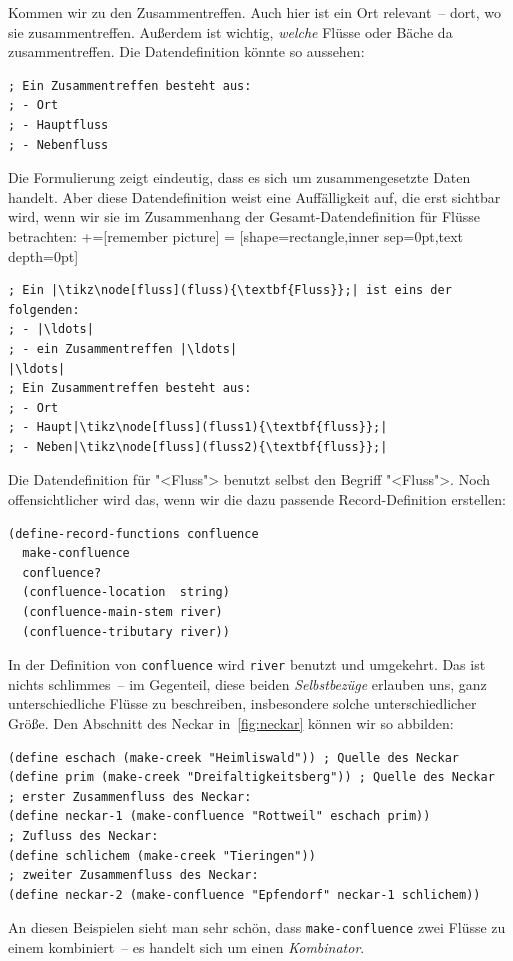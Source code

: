Kommen wir zu den Zusammentreffen.  Auch hier ist ein Ort relevant~--
dort, wo sie zusammentreffen.  Außerdem ist wichtig, \emph{welche}
Flüsse oder Bäche da zusammentreffen.  Die Datendefinition könnte so
aussehen:
%
\begin{lstlisting}
; Ein Zusammentreffen besteht aus:
; - Ort
; - Hauptfluss
; - Nebenfluss
\end{lstlisting}
%
Die Formulierung zeigt eindeutig, dass es sich um zusammengesetzte
Daten handelt.  Aber diese Datendefinition weist eine Auffälligkeit
auf, die erst sichtbar wird, wenn wir sie im Zusammenhang der
Gesamt-Datendefinition für Flüsse betrachten:
%
+=[remember picture]
 = [shape=rectangle,inner sep=0pt,text depth=0pt]
%
\begin{lstlisting}
; Ein |\tikz\node[fluss](fluss){\textbf{Fluss}};| ist eins der folgenden:
; - |\ldots|
; - ein Zusammentreffen |\ldots|
|\ldots|
; Ein Zusammentreffen besteht aus:
; - Ort
; - Haupt|\tikz\node[fluss](fluss1){\textbf{fluss}};|
; - Neben|\tikz\node[fluss](fluss2){\textbf{fluss}};|
\end{lstlisting}
%
%
Die Datendefinition für "<Fluss"> benutzt selbst den Begriff
"<Fluss">.   Noch offensichtlicher wird das, wenn wir die dazu
passende Record-Definition erstellen:
%
\begin{lstlisting}
(define-record-functions confluence
  make-confluence
  confluence?
  (confluence-location  string)
  (confluence-main-stem river)
  (confluence-tributary river))
\end{lstlisting}
%
In der Definition von \texttt{confluence} wird \texttt{river} benutzt
und umgekehrt.  Das ist nichts schlimmes~-- im Gegenteil, diese beiden
\textit{Selbstbezüge} erlauben uns, ganz
unterschiedliche Flüsse zu beschreiben, insbesondere solche
unterschiedlicher Größe.  Den Abschnitt des Neckar in~\ref{fig:neckar}
können wir so abbilden:
%
\begin{lstlisting}
(define eschach (make-creek "Heimliswald")) ; Quelle des Neckar
(define prim (make-creek "Dreifaltigkeitsberg")) ; Quelle des Neckar
; erster Zusammenfluss des Neckar:
(define neckar-1 (make-confluence "Rottweil" eschach prim))
; Zufluss des Neckar:
(define schlichem (make-creek "Tieringen")) 
; zweiter Zusammenfluss des Neckar:
(define neckar-2 (make-confluence "Epfendorf" neckar-1 schlichem))
\end{lstlisting}
%
An diesen Beispielen sieht man sehr schön, dass
\texttt{make-confluence} zwei Flüsse zu einem kombiniert~-- es handelt
sich um einen \textit{Kombinator}.

